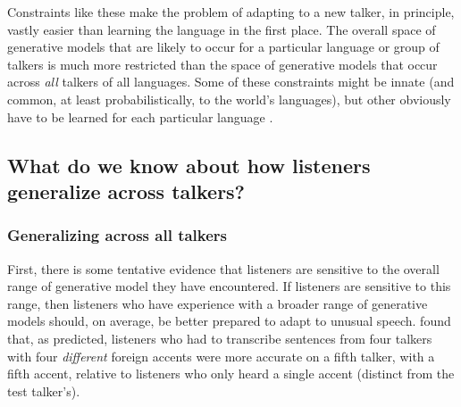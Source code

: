 Constraints like these make the problem of adapting to a new talker, in principle, vastly easier than learning the language in the first place.  The overall space of generative models that are likely to occur for a particular language or group of talkers is much more restricted than the space of generative models that occur across \emph{all} talkers of all languages.  Some of these constraints might be innate (and common, at least probabilistically, to the world's languages), but other obviously have to be learned for each particular language \autocite[like the range of mean VOTs allowed for each category][]{Lisker1964}.

\subsection{What do we know about how listeners generalize across talkers?}
\label{sec:what-do-we-know-gen}

\subsubsection{Generalizing across all talkers}
\label{sec:gener-across-all}

First, there is some tentative evidence that listeners are sensitive to the overall range of generative model they have encountered.  If listeners are sensitive to this range, then listeners who have experience with a broader range of generative models should, on average, be better prepared to adapt to unusual speech. \textcite{Baese-berk2013} found that, as predicted, listeners who had to transcribe sentences from four talkers with four \emph{different} foreign accents were more accurate on a fifth talker, with a fifth accent, relative to listeners who only heard a single accent (distinct from the test talker's).  

